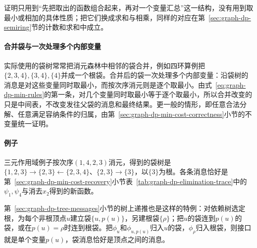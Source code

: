 证明只用到“先把取出的函数组合起来，再对一个变量汇总”这一结构，没有用到取最小或相加的具体性质；把它们换成求和与相乘，同样的对应在第~\ref{sec:graph-dp-semiring}节的计数和求和中成立。

\paragraph{合并袋与一次处理多个内部变量}
实际使用的袋树常常把消元森林中相邻的袋合并，例如四环算例把$\{2,3,4\},\{3,4\},\{4\}$并成一个根袋。合并后的袋一次处理多个内部变量：沿袋树的消息是对这些变量同时取最小，而按次序消元则是逐个取最小。由式~\eqref{eq:graph-dp-min-rules}的第一条，对几个变量同时取最小等于逐个取最小，所以合并改变的只是中间表，不改变发往父袋的消息和最终结果。更一般的情形，即任意合法分解、任意满足容纳条件的归属，由第~\ref{sec:graph-dp-min-cost-correctness}小节的不变量统一证明。

\paragraph{例子}
三元作用域例子按次序$(1,4,2,3)$消元，得到的袋树是$\{1,2,3\}\to\{2,3\}\leftarrow\{2,3,4\}$、$\{2,3\}\to\{3\}$，以$\{3\}$为根。各条消息恰好是第~\ref{sec:graph-dp-min-cost-recovery}小节表~\ref{tab:graph-dp-elimination-trace}中的$\psi_1,\psi_4$与消去$x_2$得到的新函数。

第~\ref{sec:graph-dp-tree-messages}小节的树上递推也是这样的特例：对依赖树选定根，为每个非根顶点$u$建立袋$\{u,p(u)\}$，另建根袋$\{\rho\}$；把$u$的袋连到$p(u)$的袋，或在$p(u)=\rho$时连到根袋。把$\phi_u$和$\phi_{u,p(u)}$归入$u$的袋，$\phi_\rho$归入根袋，则接口就是单个变量$p(u)$，袋消息恰好是顶点之间的消息。
